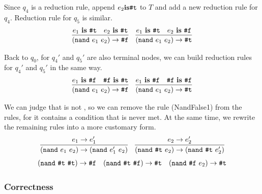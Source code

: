 Since $q_4$ is a reduction rule, append $e_2 \mbox{\rm \bf is} \mbox{\tt \#t}$ to $T$ and add a new reduction rule for $q_4$. Reduction rule for $q_5$ is similar.
\[
\begin{array}{c}
\infer{(\m{nand}~e_1~e_2) \to \m{\#f}}{e_1~\key{is}~\m{\#t}\quad e_2~\key{is}~\m{\#t}}
\quad
\infer{(\m{nand}~e_1~e_2) \to \m{\#t}}{e_1~\key{is}~\m{\#t}\quad e_2~\key{is}~\m{\#f}}
\end{array}
\]

Back to $q_0$, for $q_4'$ and $q_5'$ are also terminal nodes, we can build reduction rules for $q_4'$ and $q_5'$ in the same way.
\[
\begin{array}{c}
\infer{(\m{nand}~e_1~e_2) \to \m{\#f}}{e_1~\key{is}~\m{\#f}\quad \m{\#f}~\key{is}~\m{\#t}}
\quad
\infer{(\m{nand}~e_1~e_2) \to \m{\#t}}{e_1~\key{is}~\m{\#f}\quad \m{\#f}~\key{is}~\m{\#f}}
\end{array}
\]

We can judge that  is not , so we can remove the rule (NandFalse1) from the rules, for it contains a condition that is never met. At the same time, we rewrite the remaining rules into a more customary form.
\[
\begin{array}{cc}
\infer{(\m{nand}~e_1~e_2) \to (\m{nand}~e_1'~e_2)}{e_1 \to e_1'}
&
\infer{(\m{nand}~\m{\#t}~e_2) \to (\m{nand}~\m{\#t}~e_2')}{e_2 \to e_2'}
\end{array}
\]\[
\begin{array}{ccc}
(\mbox{\tt nand}~\mbox{\tt \#t}~\mbox{\tt \#t}) \to \mbox{\tt \#f}
&
(\mbox{\tt nand}~\mbox{\tt \#t}~\mbox{\tt \#f}) \to \mbox{\tt \#t}
&
(\mbox{\tt nand}~\mbox{\tt \#f}~e_2) \to \mbox{\tt \#t}
\end{array}
\]



\subsubsection{Correctness}

